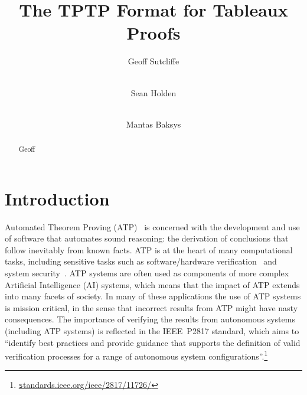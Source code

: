 \documentclass[runningheads]{llncs}
\newcommand{\smalltt}[1]{\small \texttt{#1}}
\begin{document}
\title{The TPTP Format for Tableaux Proofs}

\author{
Geoff Sutcliffe\Envelope
\and
\\ Sean Holden
\and
\\ Mantas Baksys
}

\maketitle
\begin{abstract}
Geoff

\end{abstract}
\section{Introduction}
\label{Introduction}


Automated Theorem Proving (ATP)~\cite{RV01-HAR} is concerned with the development and use of 
software that automates sound reasoning: the derivation of conclusions that follow inevitably 
from known facts.
ATP is at the heart of many computational tasks, including sensitive tasks such as 
software/hardware verification~\cite{HH19} and system security~\cite{Coo18}.
ATP systems are often used as components of more complex Artificial Intelligence (AI) systems,
which means that the impact of ATP extends into many facets of society.
In many of these applications the use of ATP systems is mission critical, in the sense that 
incorrect results from ATP might have nasty consequences.
The importance of verifying the results from autonomous systems (including ATP systems) is
reflected in the IEEE~P2817 standard, which aims to ``identify best practices and provide guidance 
that supports the definition of valid verification processes for a range of autonomous system 
configurations''.\footnote{%
\href{https://standards.ieee.org/ieee/2817/11726/}{\smalltt standards.ieee.org/ieee/2817/11726/}}
\end{document}
